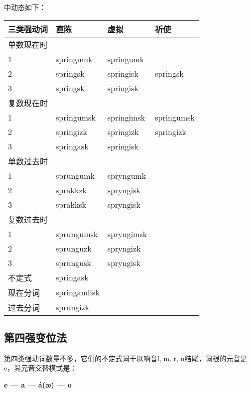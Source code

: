 中动态如下：

\begin{longtable}{llll}
    \toprule
    三类强动词 & 直陈           & 虚拟         & 祈使         \\
    \midrule
    \endhead
    \bottomrule
    \endfoot
    单数现在时 &              &            &            \\
    1     & springumk    & springumk  &            \\
    2     & springsk     & springisk  & springsk   \\
    3     & springsk     & springisk  &            \\
    复数现在时 &              &            &            \\
    1     & springumsk   & springimsk & springumsk \\
    2     & springizk    & springizk  & springizk  \\
    3     & springask    & springisk  &            \\
    单数过去时 &              &            &            \\
    1     & sprungumk    & spryngumk  &            \\
    2     & sprakkzk     & spryngisk  &            \\
    3     & sprakksk     & spryngisk  &            \\
    复数过去时 &              &            &            \\
    1     & sprungumsk   & spryngimsk &            \\
    2     & sprunguzk    & spryngizk  &            \\
    3     & sprungusk    & spryngisk  &            \\
    不定式   & springask    &            &            \\
    现在分词  & springandisk &            &            \\
    过去分词  & sprungizk    &            &            \\
\end{longtable}

\subsection{第四强变位法}\label{第四强变位法}

第四类强动词数量不多，它们的不定式词干以响音l, m, r, n结尾，词根的元音是e，其元音交替模式是：

\begin{center}
    \textbf{e --- a --- á(æ) --- o}
\end{center}


